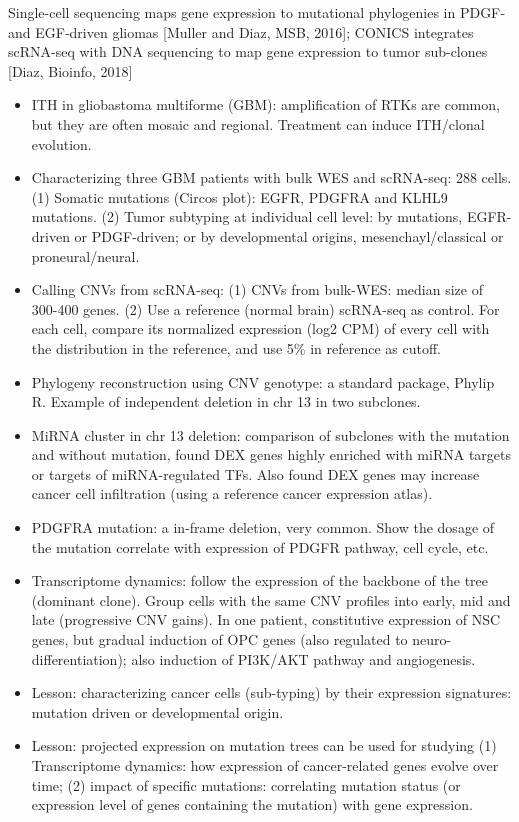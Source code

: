 \documentclass{report}
\begin{document}
Single-cell sequencing maps gene expression to mutational phylogenies in PDGF‐ and EGF‐driven gliomas [Muller and Diaz, MSB, 2016]; CONICS integrates scRNA-seq with DNA sequencing to map gene expression to tumor sub-clones [Diaz, Bioinfo, 2018]
\begin{itemize}
	
	\item ITH in gliobastoma multiforme (GBM): amplification of RTKs are common, but they are often mosaic and regional. Treatment can induce ITH/clonal evolution. 
	
	\item Characterizing three GBM patients with bulk WES and scRNA-seq: 288 cells. (1) Somatic mutations (Circos plot): EGFR, PDGFRA and KLHL9 mutations. (2) Tumor subtyping at individual cell level: by mutations, EGFR-driven or PDGF-driven; or by developmental origins, mesenchayl/classical or proneural/neural. 
	
	\item Calling CNVs from scRNA-seq: (1) CNVs from bulk-WES: median size of 300-400 genes. (2) Use a reference (normal brain) scRNA-seq as control. For each cell, compare its normalized expression (log2 CPM) of every cell with the distribution in the reference, and use 5\% in reference as cutoff. 
	
	\item Phylogeny reconstruction using CNV genotype: a standard package, Phylip R. Example of independent deletion in chr 13 in two subclones. 
	
	\item MiRNA cluster in chr 13 deletion: comparison of subclones with the mutation and without mutation, found DEX genes highly enriched with miRNA targets or targets of miRNA-regulated TFs. Also found DEX genes may increase cancer cell infiltration (using a reference cancer expression atlas). 
	
	\item PDGFRA mutation: a in-frame deletion, very common. Show the dosage of the mutation correlate with expression of PDGFR pathway, cell cycle, etc. 
	
	\item Transcriptome dynamics: follow the expression of the backbone of the tree (dominant clone). Group cells with the same CNV profiles into early, mid and late (progressive CNV gains). In one patient, constitutive expression of NSC genes, but gradual induction of OPC genes (also regulated to neuro-differentiation); also induction of PI3K/AKT pathway and angiogenesis.  
	
	\item Lesson: characterizing cancer cells (sub-typing) by their expression signatures: mutation driven or developmental origin. 
	
	\item Lesson: projected expression on mutation trees can be used for studying (1) Transcriptome dynamics: how expression of cancer-related genes evolve over time; (2) impact of specific mutations:  correlating mutation status (or expression level of genes containing the mutation) with gene expression. 
\end{itemize}
\end{document}
